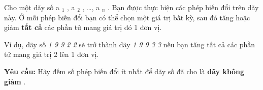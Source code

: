 Cho một dãy số a $_ 1 $ , a $_ 2 $ , …, a $_ n $ . Bạn được thực hiện các phép biến đổi trên dãy này. Ở mỗi phép biến đổi bạn có thể chọn một giá trị bất kỳ, sau đó tăng hoặc giảm \textbf{ tất cả } các phần tử mang giá trị đó 1 đơn vị.

Ví dụ, dãy số \emph{ 1 9 9 2 2 } sẽ trở thành dãy \emph{ 1 9 9 3 3 } nếu bạn tăng tất cả các phần tử mang giá trị 2 lên 1 đơn vị.

\textbf{Yêu cầu: } Hãy đếm số phép biến đổi ít nhất để dãy số đã cho là \textbf{ dãy không giảm } .